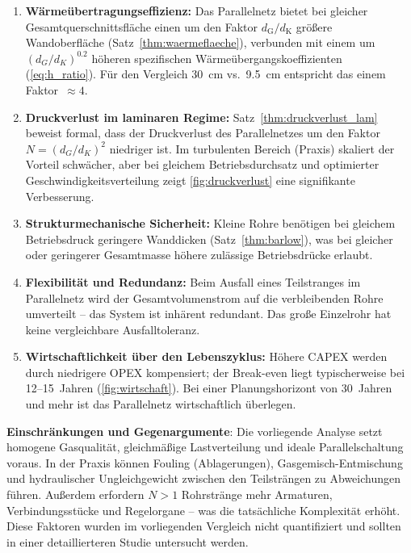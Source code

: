 ﻿\documentclass[12pt,a4paper,twoside]{article}
\theoremstyle{plain}
\theoremstyle{definition}
\theoremstyle{remark}
\newcommand{\dG}{d_{\mathrm{G}}}
\newcommand{\dK}{d_{\mathrm{K}}}
\begin{document}
\begin{enumerate}[label=\textbf{(\arabic*)}, leftmargin=2.5em]
  \item \textbf{Wärmeübertragungseffizienz:}
        Das Parallelnetz bietet bei gleicher Gesamtquerschnittsfläche einen
        um den Faktor $\dG/\dK$ größere Wandoberfläche (Satz~\ref{thm:waermeflaeche}),
        verbunden mit einem um $(d_G/d_K)^{0.2}$ höheren spezifischen
        Wärmeübergangskoeffizienten (\cref{eq:h_ratio}).
        Für den Vergleich \SI{30}{\centi\metre} vs.\ \SI{9.5}{\centi\metre}
        entspricht das einem Faktor~$\approx 4$.

  \item \textbf{Druckverlust im laminaren Regime:}
        Satz~\ref{thm:druckverlust_lam} beweist formal, dass der
        Druckverlust des Parallelnetzes um den Faktor $N = (d_G/d_K)^2$ niedriger
        ist. Im turbulenten Bereich (Praxis) skaliert der Vorteil schwächer, aber
        bei gleichem Betriebsdurchsatz und optimierter Geschwindigkeitsverteilung
        zeigt \cref{fig:druckverlust} eine signifikante Verbesserung.

  \item \textbf{Strukturmechanische Sicherheit:}
        Kleine Rohre benötigen bei gleichem Betriebsdruck geringere Wanddicken
        (Satz~\ref{thm:barlow}), was bei gleicher oder geringerer Gesamtmasse
        höhere zulässige Betriebsdrücke erlaubt.

  \item \textbf{Flexibilität und Redundanz:}
        Beim Ausfall eines Teilstranges im Parallelnetz wird der
        Gesamtvolumenstrom auf die verbleibenden Rohre umverteilt -- das System
        ist inhärent redundant.
        Das große Einzelrohr hat keine vergleichbare Ausfalltoleranz.

  \item \textbf{Wirtschaftlichkeit über den Lebenszyklus:}
        Höhere CAPEX werden durch niedrigere OPEX kompensiert; der Break-even
        liegt typischerweise bei 12--15~Jahren (\cref{fig:wirtschaft}).
        Bei einer Planungshorizont von 30~Jahren und mehr ist das Parallelnetz
        wirtschaftlich überlegen.
\end{enumerate}

\noindent
\textbf{Einschränkungen und Gegenargumente}: Die vorliegende Analyse
setzt homogene Gasqualität, gleichmäßige Lastverteilung und ideale
Parallelschaltung voraus.
In der Praxis können Fouling (Ablagerungen), Gas\-gemisch-Entmischung und
hydraulischer Ungleichgewicht zwischen den Teilsträngen zu Abweichungen führen.
Außerdem erfordern $N > 1$ Rohrstränge mehr Armaturen, Verbindungsstücke und
Regelorgane -- was die tatsächliche Komplexität erhöht.
Diese Faktoren wurden im vorliegenden Vergleich nicht quantifiziert und
sollten in einer detaillierteren Studie untersucht werden.
\end{document}
